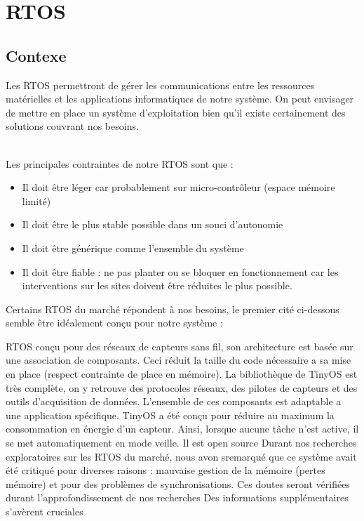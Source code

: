 \section{RTOS}
	\subsection {Contexe}
		Les RTOS permettront de gérer les communications entre les ressources matérielles et les applications informatiques de notre système. On peut envisager de mettre en place un système d'exploitation bien qu'il existe certainement des solutions couvrant nos besoins. \\~
		
		Les principales contraintes de notre RTOS sont que :
		\begin{itemize}
				\item Il doit être léger car probablement sur micro-contrôleur (espace mémoire limité)
				\item Il doit être le plus stable possible dans un souci d'autonomie
				\item Il doit être générique comme l'ensemble du système
				\item Il doit être fiable : ne pas planter ou se bloquer en fonctionnement car les interventions sur les sites doivent être réduites le plus possible.
		\end{itemize}

		Certains RTOS du marché répondent à nos besoins, le premier cité ci-dessous semble être idéalement conçu pour notre système :
		
		  
{RTOS conçu pour des réseaux de capteurs sans fil, son architecture est basée sur une association de composants.}
{Ceci réduit la taille du code nécessaire a sa mise en place (respect contrainte de place en mémoire). La bibliothèque de TinyOS est très complète, on y retrouve des protocoles réseaux, des pilotes de capteurs et des outils d'acquisition de données. L'ensemble de ces composants est adaptable a une application spécifique.}
{TinyOS a été conçu pour réduire au maximum la consommation en énergie d’un capteur. Ainsi, lorsque aucune tâche n’est active, il se met automatiquement en mode veille.}
{Il est open source}
{Durant nos recherches exploratoires sur les RTOS du marché, nous avon sremarqué que ce système avait été critiqué pour diverses raisons : mauvaise
gestion de la mémoire (pertes mémoire) et pour des problèmes de synchronisations. Ces doutes seront vérifiées durant l'approfondissement de nos recherches}
{Des informations supplémentaires s'avèrent cruciales}

